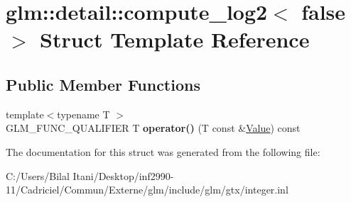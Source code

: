 \hypertarget{structglm_1_1detail_1_1compute__log2_3_01false_01_4}{}\section{glm\+:\+:detail\+:\+:compute\+\_\+log2$<$ false $>$ Struct Template Reference}
\label{structglm_1_1detail_1_1compute__log2_3_01false_01_4}
\subsection*{Public Member Functions}
\begin{DoxyCompactItemize}
\item 
{\footnotesize template$<$typename T $>$ }\\G\+L\+M\+\_\+\+F\+U\+N\+C\+\_\+\+Q\+U\+A\+L\+I\+F\+I\+ER T {\bfseries operator()} (T const \&\hyperlink{document_8h_a071cf97155ba72ac9a1fc4ad7e63d481}{Value}) const \hypertarget{structglm_1_1detail_1_1compute__log2_3_01false_01_4_a8aef11c23abbfbc89222dfc5f2ffd260}{}\label{structglm_1_1detail_1_1compute__log2_3_01false_01_4_a8aef11c23abbfbc89222dfc5f2ffd260}

\end{DoxyCompactItemize}


The documentation for this struct was generated from the following file\+:\begin{DoxyCompactItemize}
\item 
C\+:/\+Users/\+Bilal Itani/\+Desktop/inf2990-\/11/\+Cadriciel/\+Commun/\+Externe/glm/include/glm/gtx/integer.\+inl\end{DoxyCompactItemize}
